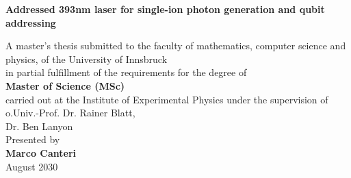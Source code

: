 
\begin{titlepage}


 \thispagestyle{frontpage}

 \begin{center}

   \vspace*{6\baselineskip}


   {\Huge \textbf{Addressed 393nm laser for single-ion photon generation and qubit addressing\\}}



       \vspace*{1,5\baselineskip}


   \vspace{1,5\baselineskip}

   \large{A master’s thesis submitted to the faculty of mathematics, computer science and physics, of the University of Innsbruck\\ in partial fulfillment of the requirements for the degree of\\\vspace{1,2\baselineskip}\textbf{Master of Science (MSc)} \\\vspace{1,2\baselineskip}carried out at the Institute of Experimental Physics under the supervision of}\\
   \large{o.Univ.-Prof.  Dr.  Rainer Blatt,}\\
   \large{Dr. Ben Lanyon}\\
    \vspace{1,2\baselineskip}
   \large{Presented by\\}
   \huge{\textbf{Marco Canteri}}\\
   \vfill
   \large{August 2030}

 \end{center}

\end{titlepage}
